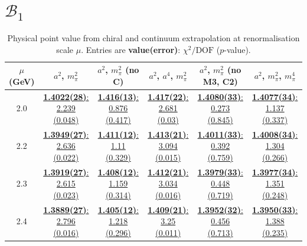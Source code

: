 \documentclass[12pt]{extarticle}
\begin{document}
\section{$\mathcal{B}_1$}
\begin{table}[h!]
\begin{center}
\begin{tabular}{|c|c|c|c|c|c|}
\hline
$\mu$ (GeV) & $a^2$, $m_\pi^2$& $a^2$, $m_\pi^2$ (no C)& $a^2$, $a^4$, $m_\pi^2$& $a^2$, $m_\pi^2$ (no M3, C2)& $a^2$, $m_\pi^2$, $m_\pi^4$\\
\hline
2.0& \hyperlink{VVpAA/NPR/a2m2_20.pdf.1}{\textbf{1.4022(28)}: 2.239 (0.048)} & \hyperlink{VVpAA/NPR/a2m2noC_20.pdf.1}{\textbf{1.416(13)}: 0.876 (0.417)} & \hyperlink{VVpAA/NPR/a2a4m2_20.pdf.1}{\textbf{1.417(22)}: 2.681 (0.03)} & \hyperlink{VVpAA/NPR/a2m2mcut_20.pdf.1}{\textbf{1.4080(33)}: 0.273 (0.845)} & \hyperlink{VVpAA/NPR/a2m2m4_20.pdf.1}{\textbf{1.4077(34)}: 1.137 (0.337)}\\
2.2& \hyperlink{VVpAA/NPR/a2m2_22.pdf.1}{\textbf{1.3949(27)}: 2.636 (0.022)} & \hyperlink{VVpAA/NPR/a2m2noC_22.pdf.1}{\textbf{1.411(12)}: 1.11 (0.329)} & \hyperlink{VVpAA/NPR/a2a4m2_22.pdf.1}{\textbf{1.413(21)}: 3.094 (0.015)} & \hyperlink{VVpAA/NPR/a2m2mcut_22.pdf.1}{\textbf{1.4011(33)}: 0.392 (0.759)} & \hyperlink{VVpAA/NPR/a2m2m4_22.pdf.1}{\textbf{1.4008(34)}: 1.304 (0.266)}\\
2.3& \hyperlink{VVpAA/NPR/a2m2_23.pdf.1}{\textbf{1.3919(27)}: 2.615 (0.023)} & \hyperlink{VVpAA/NPR/a2m2noC_23.pdf.1}{\textbf{1.408(12)}: 1.159 (0.314)} & \hyperlink{VVpAA/NPR/a2a4m2_23.pdf.1}{\textbf{1.412(21)}: 3.034 (0.016)} & \hyperlink{VVpAA/NPR/a2m2mcut_23.pdf.1}{\textbf{1.3979(33)}: 0.448 (0.719)} & \hyperlink{VVpAA/NPR/a2m2m4_23.pdf.1}{\textbf{1.3977(34)}: 1.351 (0.248)}\\
2.4& \hyperlink{VVpAA/NPR/a2m2_24.pdf.1}{\textbf{1.3889(27)}: 2.796 (0.016)} & \hyperlink{VVpAA/NPR/a2m2noC_24.pdf.1}{\textbf{1.405(12)}: 1.218 (0.296)} & \hyperlink{VVpAA/NPR/a2a4m2_24.pdf.1}{\textbf{1.409(21)}: 3.25 (0.011)} & \hyperlink{VVpAA/NPR/a2m2mcut_24.pdf.1}{\textbf{1.3952(32)}: 0.456 (0.713)} & \hyperlink{VVpAA/NPR/a2m2m4_24.pdf.1}{\textbf{1.3950(33)}: 1.388 (0.235)}\\
\hline
\end{tabular}
\caption{Physical point value from chiral and continuum extrapolation at renormalisation scale $\mu$. Entries are \textbf{value(error)}: $\chi^2/\text{DOF}$ ($p$-value).}
\end{center}
\end{table}
\end{document}
